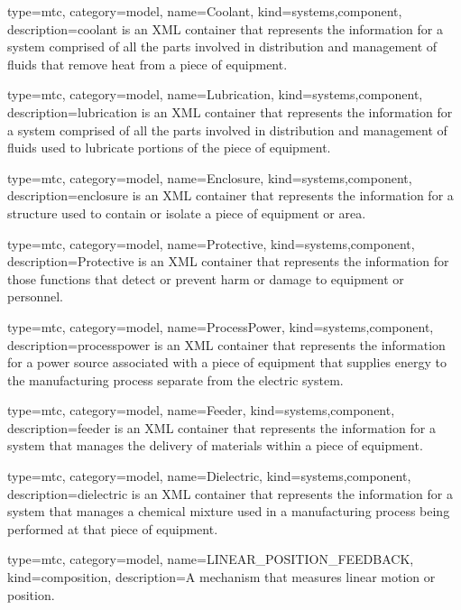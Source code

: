 {
  type=mtc,
  category=model,
  name={Coolant},
  kind={systems,component},
  description={\gls{coolant} is an XML container that represents the information for a system comprised of all the parts involved in distribution and management of fluids that remove heat from a piece of equipment.}
}


{
  type=mtc,
  category=model,
  name={Lubrication},
  kind={systems,component},
  description={\gls{lubrication} is an XML container that represents the information for a system comprised of all the parts involved in distribution and management of fluids used to lubricate portions of the piece of equipment.}
}


{
  type=mtc,
  category=model,
  name={Enclosure},
  kind={systems,component},
  description={\gls{enclosure} is an XML container that represents the information for a structure used to contain or isolate a piece of equipment or area.}
}


{
  type=mtc,
  category=model,
  name={Protective},
  kind={systems,component},
  description={Protective is an XML container that represents the information for those functions that detect or prevent harm or damage to equipment or personnel.}
}


{
  type=mtc,
  category=model,
  name={ProcessPower},
  kind={systems,component},
  description={\gls{processpower} is an XML container that represents the information for a power source associated with a piece of equipment that supplies energy to the manufacturing process separate from the \gls{electric} system.}
}


{
  type=mtc,
  category=model,
  name={Feeder},
  kind={systems,component},
  description={\gls{feeder} is an XML container that represents the information for a system that manages the delivery of materials within a piece of equipment. }
}


{
  type=mtc,
  category=model,
  name={Dielectric},
  kind={systems,component},
  description={\gls{dielectric} is an XML container that represents the information for a system that manages a chemical mixture used in a manufacturing process being performed at that piece of equipment.}
}


{
  type=mtc,
  category=model,
  name={LINEAR\_POSITION\_FEEDBACK},
  kind={composition},
  description={A mechanism that measures linear motion or position.}
}


